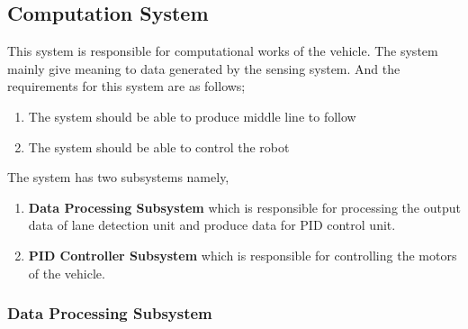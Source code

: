 \documentclass[a4paper,12pt]{article}
\begin{document}
	
	
	
	
			
		
		\subsection{Computation System}
		
		
		
			This system is responsible for computational works of the vehicle. The system mainly give meaning to data generated by the sensing system. And the requirements for this system are as follows; 
			
		\begin{enumerate}
			\item The system should	be able to produce middle line to follow
			\item The system should be able to control the robot
		\end{enumerate}	
			
			The system has two subsystems namely,
			
			\begin{enumerate}
				\item \textbf{Data Processing Subsystem} which is responsible for processing the output data of lane detection unit and produce data for PID control unit.
				\item \textbf{PID Controller Subsystem} which is responsible for controlling the motors of the vehicle.
			\end{enumerate}
			
		
		
		\subsubsection{Data Processing Subsystem}\label{sect:dataProcessingSubsystem}
		
\end{document}
